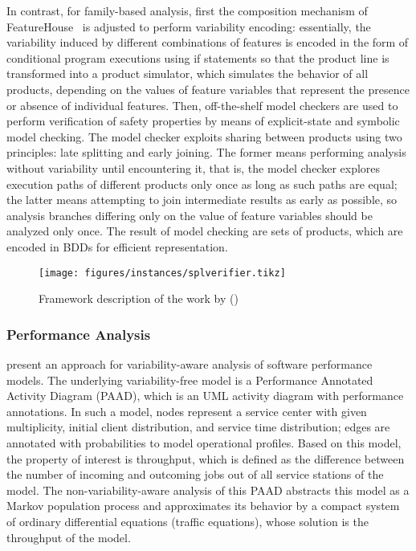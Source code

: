 In contrast, for family-based analysis, first the composition mechanism of FeatureHouse~\cite{FeatureHouse} is adjusted to 
perform variability encoding: essentially, the variability induced by different combinations of features 
is encoded in the form of conditional program executions using if statements so that the product line is 
transformed into a product simulator, which simulates the behavior of all products,
depending on the values of feature variables that represent the presence or absence of individual features. 
Then, off-the-shelf model checkers are used to perform verification of safety properties by means of explicit-state 
and symbolic model checking. The model checker exploits sharing between products using two principles: late 
splitting and early joining. The former means performing analysis without variability until encountering it, 
that is, the model checker explores execution paths of different products only once as long as such paths are 
equal; the latter means attempting to join intermediate results as early as possible, so analysis branches 
differing only on the value of feature variables should be analyzed only once. The result of model checking 
are sets of products, which are encoded in BDDs for efficient representation.

\begin{figure}[!htbp]
	\centering
        \texttt{[image: figures/instances/splverifier.tikz]}
	\caption{Framework description of  the work by \citet{ApelSimulator} ()}
	\label{fig:instance-splverifier}
\end{figure}

\subsubsection{Performance Analysis}
\label{sec:instance-performance}

\citet{kowal_scaling_2015} present an approach for variability-aware analysis of software performance 
models. The underlying variability-free model is a Performance Annotated Activity Diagram (PAAD), which is an UML 
activity diagram with performance annotations. In such a model, nodes represent a service center with given multiplicity, 
initial client distribution, and service time distribution; edges are annotated with probabilities to model operational 
profiles. Based on this model, the property of interest is throughput, which is defined as the difference between the 
number of incoming and outcoming jobs out of all service stations of the model. The non-variability-aware analysis of 
this PAAD abstracts this model as a Markov population process and approximates its behavior by a compact system of 
ordinary differential equations (traffic equations), whose solution is the throughput of the model. 

